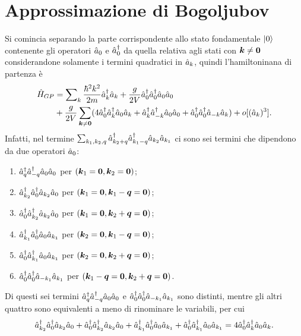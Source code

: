 \section{Approssimazione di Bogoljubov}
Si comincia separando la parte corrispondente allo stato fondamentale $\ket{0}$ contenente gli operatori $\hat{a}_0$ e $\hat{a}^\dagger_0$ da quella relativa agli stati con $\bm{k} \neq \bm{0}$ considerandone solamente i termini quadratici in $\hat{a}_k$, quindi l'hamiltoninana di partenza è
\begin{equation}
\label{eq: hamiltoniana G-P per approx. Bogoljubov}
    \begin{split}
        \hat{H}_{GP} &= \sum\nolimits_k\frac{\hbar^2k^2}{2m}\hat{a}^\dagger_k\hat{a}_k + \frac{g}{2V}\hat{a}^\dagger_0\hat{a}^\dagger_0\hat{a}_0\hat{a}_0 \\
        &+ \frac{g}{2V}\sum_{\bm{k} \neq \bm{0}}(4\hat{a}^\dagger_0\hat{a}^\dagger_k\hat{a}_0\hat{a}_k + \hat{a}^\dagger_k\hat{a}^\dagger_{-k}\hat{a}_0\hat{a}_0 + \hat{a}^\dagger_0\hat{a}^\dagger_0\hat{a}_{-k}\hat{a}_k) + o[(\hat{a}_k)^3].
    \end{split}
\end{equation}
Infatti, nel termine $\sum_{k_1,k_2,q}\hat{a}^\dagger_{k_2 + q}\hat{a}^\dagger_{k_1 - q}\hat{a}_{k_2}\hat{a}_{k_1}$ ci sono sei termini che dipendono da due operatori $\hat{a}_0$:
\begin{enumerate}
    \item $\hat{a}^\dagger_q\hat{a}^\dagger_{-q}\hat{a}_0\hat{a}_0$ per $(\bm{k}_1 = \bm{0}, \bm{k}_2 = \bm{0})$;
    \item $\hat{a}^\dagger_{k_2}\hat{a}^\dagger_0\hat{a}_{k_2}\hat{a}_0$ per $(\bm{k}_1 = \bm{0}, \bm{k}_1 - \bm{q} = \bm{0})$;
    \item $\hat{a}^\dagger_0\hat{a}^\dagger_{k_2}\hat{a}_{k_2}\hat{a}_0$ per $(\bm{k}_1 = \bm{0}, \bm{k}_2 + \bm{q} = \bm{0})$;
    \item $\hat{a}^\dagger_{k_1}\hat{a}^\dagger_0\hat{a}_0\hat{a}_{k_1}$ per $(\bm{k}_2 = \bm{0}, \bm{k}_1 - \bm{q} = \bm{0})$;
    \item $\hat{a}^\dagger_0\hat{a}^\dagger_{k_1}\hat{a}_0\hat{a}_{k_1}$ per $(\bm{k}_2 = \bm{0}, \bm{k}_2 + \bm{q} = \bm{0})$;
    \item $\hat{a}^\dagger_0\hat{a}^\dagger_0\hat{a}_{-k_1}\hat{a}_{k_1}$ per $(\bm{k}_1 - \bm{q} = \bm{0}, \bm{k}_2 + \bm{q} = \bm{0})$.
\end{enumerate}
Di questi sei termini $\hat{a}^\dagger_q\hat{a}^\dagger_{-q}\hat{a}_0\hat{a}_0$ e $\hat{a}^\dagger_0\hat{a}^\dagger_0\hat{a}_{-k_1}\hat{a}_{k_1}$ sono distinti, mentre gli altri quattro sono equivalenti a meno di rinominare le variabili, per cui 
\begin{equation}
    \hat{a}^\dagger_{k_2}\hat{a}^\dagger_0\hat{a}_{k_2}\hat{a}_0 + \hat{a}^\dagger_0\hat{a}^\dagger_{k_2}\hat{a}_{k_2}\hat{a}_0 + \hat{a}^\dagger_{k_1}\hat{a}^\dagger_0\hat{a}_0\hat{a}_{k_1} + \hat{a}^\dagger_0\hat{a}^\dagger_{k_1}\hat{a}_0\hat{a}_{k_1} = 4\hat{a}^\dagger_0\hat{a}^\dagger_k\hat{a}_0\hat{a}_k.
\end{equation}
